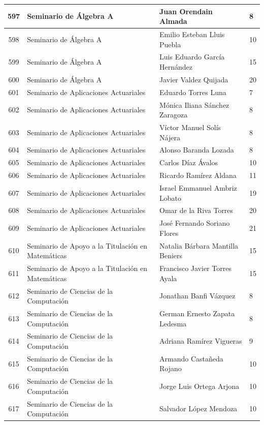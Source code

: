 {\begin{longtable}{|c|p{6.5cm}|p{5cm}|p{1.5cm}|}
  597 & Seminario de Álgebra A & Juan Orendain Almada & 8 \\ \hline
  598 & Seminario de Álgebra A & Emilio Esteban Lluis Puebla & 10 \\ \hline
  599 & Seminario de Álgebra A & Luis Eduardo García Hernández & 15 \\ \hline
  600 & Seminario de Álgebra A & Javier Valdez Quijada & 20 \\ \hline
  601 & Seminario de Aplicaciones Actuariales & Eduardo Torres Luna & 7 \\ \hline
  602 & Seminario de Aplicaciones Actuariales & Mónica Iliana Sánchez Zaragoza & 8 \\ \hline
  603 & Seminario de Aplicaciones Actuariales & Víctor Manuel Solís Nájera & 8 \\ \hline
  604 & Seminario de Aplicaciones Actuariales & Alonso Baranda Lozada & 8 \\ \hline
  605 & Seminario de Aplicaciones Actuariales & Carlos Díaz Ávalos & 10 \\ \hline
  606 & Seminario de Aplicaciones Actuariales & Ricardo Ramírez Aldana & 11 \\ \hline
  607 & Seminario de Aplicaciones Actuariales & Israel Emmanuel Ambriz Lobato & 19 \\ \hline
  608 & Seminario de Aplicaciones Actuariales & Omar de la Riva Torres & 20 \\ \hline
  609 & Seminario de Aplicaciones Actuariales & José Fernando Soriano Flores & 21 \\ \hline
  610 & Seminario de Apoyo a la Titulación en Matemáticas & Natalia Bárbara Mantilla Beniers & 15 \\ \hline
  611 & Seminario de Apoyo a la Titulación en Matemáticas & Francisco Javier Torres Ayala & 15 \\ \hline
  612 & Seminario de Ciencias de la Computación & Jonathan Banfi Vázquez & 8 \\ \hline
  613 & Seminario de Ciencias de la Computación & German Ernesto Zapata Ledesma & 8 \\ \hline
  614 & Seminario de Ciencias de la Computación & Adriana Ramírez Vigueras & 9 \\ \hline
  615 & Seminario de Ciencias de la Computación & Armando Castañeda Rojano & 10 \\ \hline
  616 & Seminario de Ciencias de la Computación & Jorge Luis Ortega Arjona & 10 \\ \hline
  617 & Seminario de Ciencias de la Computación & Salvador López Mendoza & 10 \\ \hline

\end{longtable}}
